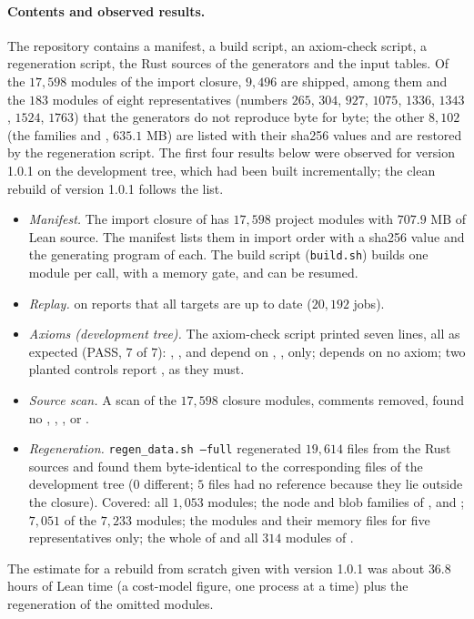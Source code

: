 \documentclass[11pt]{article}
\theoremstyle{remark}
\begin{document}
\paragraph{Contents and observed results.} The repository contains a manifest, a build script, an axiom-check script, a regeneration script, the Rust sources of the generators and the input tables. Of the $17{,}598$ modules of the import closure, $9{,}496$ are shipped, among them  and the $183$  modules of eight representatives (numbers $265$, $304$, $927$, $1075$, $1336$, $1343$, $1524$, $1763$) that the generators do not reproduce byte for byte; the other $8{,}102$ (the families  and , $635.1$ MB) are listed with their sha256 values and are restored by the regeneration script. The first four results below were observed for version 1.0.1 on the development tree, which had been built incrementally; the clean rebuild of version 1.0.1 follows the list.
\begin{itemize}
\item \emph{Manifest.} The import closure of  has $17{,}598$ project modules with $707.9$ MB of Lean source. The manifest lists them in import order with a sha256 value and the generating program of each. The build script (\texttt{build.sh}) builds one module per  call, with a memory gate, and can be resumed.
\item \emph{Replay.}  on  reports that all targets are up to date ($20{,}192$ jobs).
\item \emph{Axioms (development tree).} The axiom-check script printed seven lines, all as expected (PASS, $7$ of $7$): , ,  and  depend on , ,  only;  depends on no axiom; two planted controls report , as they must.
\item \emph{Source scan.} A scan of the $17{,}598$ closure modules, comments removed, found no , , ,  or .
\item \emph{Regeneration.} \texttt{regen\_data.sh --full} regenerated $19{,}614$ files from the Rust sources and found them byte-identical to the corresponding files of the development tree ($0$ different; $5$ files had no reference because they lie outside the closure). Covered: all $1{,}053$  modules; the node and blob families of ,  and ; $7{,}051$ of the $7{,}233$  modules; the  modules and their memory files for five representatives only; the whole of  and all $314$ modules of .
\end{itemize}
The estimate for a rebuild from scratch given with version 1.0.1 was about $36.8$ hours of Lean time (a cost-model figure, one process at a time) plus the regeneration of the omitted modules.
\end{document}

